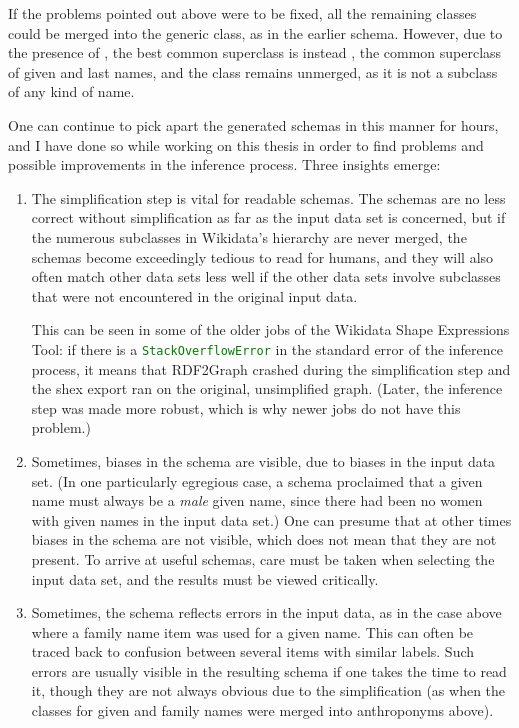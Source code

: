 If the problems pointed out above were to be fixed,
all the remaining classes could be merged into the generic  class,
as in the earlier schema.
However, due to the presence of ,
the best common superclass is instead ,
the common superclass of given and last names,
and the  class remains unmerged,
as it is not a subclass of any kind of name.

One can continue to pick apart the generated schemas in this manner for hours,
and I have done so while working on this thesis
in order to find problems and possible improvements in the inference process.
Three insights emerge:

\begin{enumerate}
\item The simplification step is vital for readable schemas.
  The schemas are no less correct without simplification as far as the input data set is concerned,
  but if the numerous subclasses in Wikidata’s hierarchy are never merged,
  the schemas become exceedingly tedious to read for humans,
  and they will also often match other data sets less well
  if the other data sets involve subclasses that were not encountered in the original input data.

  This can be seen in some of the older jobs of the Wikidata Shape Expressions Tool:
  if there is a \lstinline[language=java]{StackOverflowError} in the standard error of the inference process,
  it means that RDF2Graph crashed during the simplification step
  and the \gls{shex} export ran on the original, unsimplified graph.
  (Later, the inference step was made more robust,
  which is why newer jobs do not have this problem.)

\item Sometimes, biases in the schema are visible, due to biases in the input data set.
  (In one particularly egregious case,
  a schema proclaimed that a given name must always be a \emph{male} given name,
  since there had been no women with given names in the input data set.)
  One can presume that at other times biases in the schema are not visible,
  which does not mean that they are not present. %
  To arrive at useful schemas,
  care must be taken when selecting the input data set,
  and the results must be viewed critically. %

\item Sometimes, the schema reflects errors in the input data,
  as in the case above where a family name item was used for a given name.
  This can often be traced back to confusion between several items with similar labels.
  Such errors are usually visible in the resulting schema if one takes the time to read it,
  though they are not always obvious due to the simplification
  (as when the classes for given and family names were merged into anthroponyms above).
\end{enumerate}

